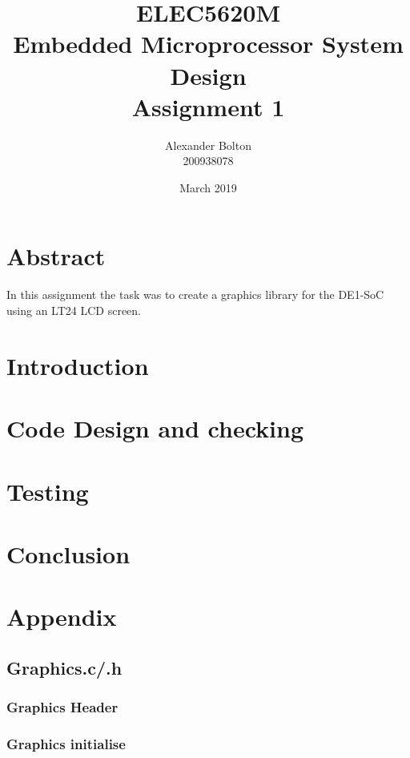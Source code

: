 \documentclass[a4paper,12pt]{article}
\newcommand{\GraphicsC}{../Graphics/Graphics.c}
\newcommand{\GraphicsH}{../Graphics/Graphics.h}
\begin{document}
\title{ELEC5620M \\ Embedded Microprocessor System Design \\ Assignment 1}
\author{Alexander Bolton \\ 200938078}
\date{March 2019}
\maketitle
\section{Abstract}
In this assignment the task was to create a graphics library for the DE1-SoC using an LT24 LCD screen. 
\newpage

\tableofcontents
\newpage

\section{Introduction}

\section{Code Design and checking}

\section{Testing}

\section{Conclusion}

\newpage
\section{Appendix}
\subsection{Graphics.c/.h}

\subsubsection{Graphics Header}

\subsubsection{Graphics initialise}

\newpage
\end{document}
